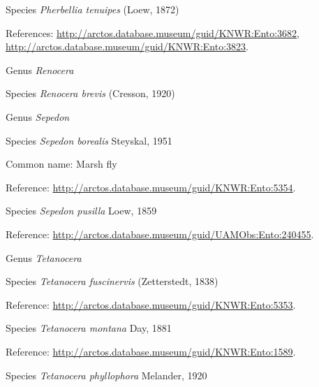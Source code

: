 \documentclass[9pt, article]{memoir}
\begin{document}
\begin{multicols}{2}
\vspace{6pt}\noindent\hspace{36pt}Species \textit{Pherbellia tenuipes} (Loew, 1872)


References: 
\url{http://arctos.database.museum/guid/KNWR:Ento:3682}, 
\url{http://arctos.database.museum/guid/KNWR:Ento:3823}.

\vspace{6pt}\noindent\hspace{30pt}Genus \textit{Renocera}


\vspace{6pt}\noindent\hspace{36pt}Species \textit{Renocera brevis} (Cresson, 1920)


\vspace{6pt}\noindent\hspace{30pt}Genus \textit{Sepedon}


\vspace{6pt}\noindent\hspace{36pt}Species \textit{Sepedon borealis} Steyskal, 1951


Common name: Marsh fly

Reference: 
\url{http://arctos.database.museum/guid/KNWR:Ento:5354}.

\vspace{6pt}\noindent\hspace{36pt}Species \textit{Sepedon pusilla} Loew, 1859


Reference: 
\url{http://arctos.database.museum/guid/UAMObs:Ento:240455}.

\vspace{6pt}\noindent\hspace{30pt}Genus \textit{Tetanocera}


\vspace{6pt}\noindent\hspace{36pt}Species \textit{Tetanocera fuscinervis} (Zetterstedt, 1838)


Reference: 
\url{http://arctos.database.museum/guid/KNWR:Ento:5353}.

\vspace{6pt}\noindent\hspace{36pt}Species \textit{Tetanocera montana} Day, 1881


Reference: 
\url{http://arctos.database.museum/guid/KNWR:Ento:1589}.

\vspace{6pt}\noindent\hspace{36pt}Species \textit{Tetanocera phyllophora} Melander, 1920



\end{multicols}
\end{document}
